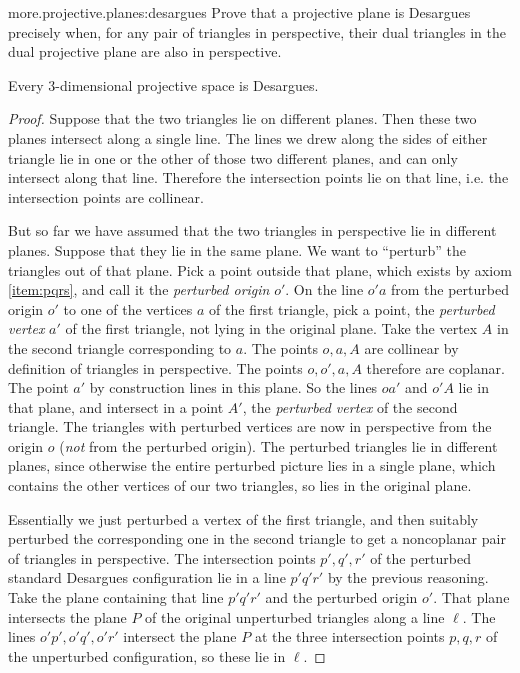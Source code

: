 \begin{problem}{more.projective.planes:desargues}
Prove that a projective plane is Desargues precisely when, for any pair of triangles in perspective, their dual triangles in the dual projective plane are also in perspective.
\end{problem}
 
\begin{lemma}
Every 3-dimensional projective space is Desargues.
\end{lemma}
\begin{center}
\end{center}
\begin{proof}
Suppose that the two triangles lie on different planes.
Then these two planes intersect along a single line.
The lines we drew along the sides of either triangle lie in one or the other of those two different planes, and can only intersect along that line.
Therefore the intersection points lie on that line, i.e. the intersection points are collinear.

But so far we have assumed that the two triangles in perspective lie in different planes.
Suppose that they lie in the same plane.
We want to ``perturb'' the triangles out of that plane.
Pick a point outside that plane, which exists by axiom \ref{item:pqrs}, and call it the \emph{perturbed origin} \(o'\).
On the line \(o'a\) from the perturbed origin \(o'\) to one of the vertices \(a\) of the first triangle, pick a point, the \emph{perturbed vertex} \(a'\) of the first triangle, not lying in the original plane.
Take the vertex \(A\) in the second triangle corresponding to \(a\).
The points \(o, a, A\) are collinear by definition of triangles in perspective.
The points \(o, o', a, A\) therefore are coplanar.
The point \(a'\) by construction lines in this plane.
So the lines \(oa'\) and \(o'A\) lie in that plane, and intersect in a point \(A'\), the \emph{perturbed vertex} of the second triangle.
The triangles with perturbed vertices are now in perspective from the origin \(o\) (\emph{not} from the perturbed origin).
The perturbed triangles lie in different planes, since otherwise the entire perturbed picture lies in a single plane, which contains the other vertices of our two triangles, so lies in the original plane.

Essentially we just perturbed a vertex of the first triangle, and then suitably perturbed the corresponding one in the second triangle to get a noncoplanar pair of triangles in perspective.
The intersection points \(p', q', r'\) of the perturbed standard Desargues configuration lie in a line \(p'q'r'\) by the previous reasoning.
Take the plane containing that line \(p'q'r'\) and the perturbed origin \(o'\).
That plane intersects the plane \(P\) of the original unperturbed triangles along a line \(\ell\).
The lines \(o'p', o'q', o'r'\) intersect the plane \(P\) at the three intersection points \(p, q, r\) of the unperturbed configuration, so these lie in \(\ell\).
\end{proof}

